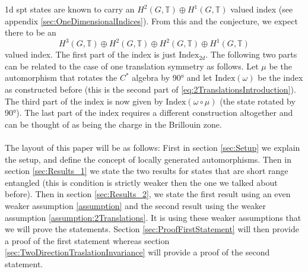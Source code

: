 \documentclass[12pt,a4paper,twoside]{article}
\newcommand{\TT}{\mathbb T}
\theoremstyle{definition}
\numberwithin{equation}{section}
\begin{document}
1d spt states are known to carry an $H^2(G,\TT)\oplus H^1(G,\TT)$ valued index (see appendix \ref{sec:OneDimensionalIndices}). From this and the conjecture, we expect there to be an
\begin{equation}\label{eq:2TranslationsIntroduction}
	H^3(G,\TT)\oplus H^2(G,\TT)\oplus H^2(G,\TT)\oplus H^1(G,\TT)
\end{equation}
valued index. The first part of the index is just $\textrm{Index}_{2d}$. The following two parts can be related to the case of one translation symmetry as follows. Let $\mu$ be the automorphism that rotates the $C^*$ algebra by 90° and let $\textrm{Index}(\omega)$ be the index as constructed before (this is the second part of \ref{eq:2TranslationsIntroduction}). The third part of the index is now given by $\textrm{Index}(\omega\circ\mu)$ (the state rotated by 90°). The last part of the index requires a different construction altogether and can be thought of as being the charge in the Brillouin zone.\\\\
The layout of this paper will be as follows: First in section \ref{sec:Setup} we explain the setup, and define the concept of locally generated automorphisms. Then in section \ref{sec:Results_1} we state the two results for states that are short range entangled (this is condition is strictly weaker then the one we talked about before). Then in section \ref{sec:Results_2}, we state the first result using an even weaker assumption \ref{assumption} and the second result using the weaker assumption \ref{assumption:2Translations}. It is using these weaker assumptions that we will prove the statements. Section \ref{sec:ProofFirstStatement} will then provide a proof of the first statement whereas section \ref{sec:TwoDirectionTraslationInvariance} will provide a proof of the second statement.
\end{document}
